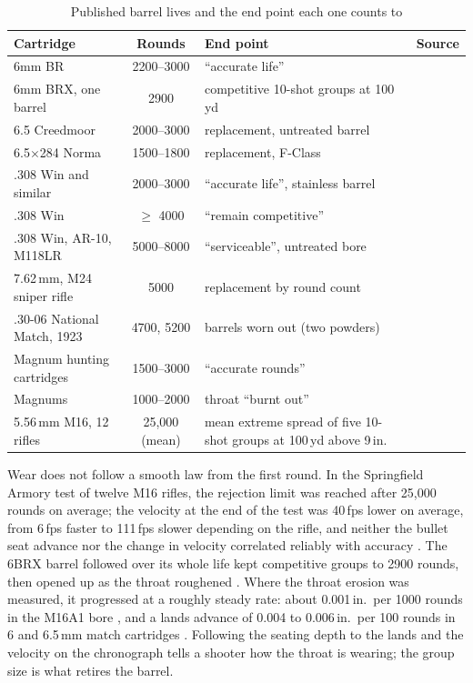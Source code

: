 \documentclass[11pt,twoside,openright]{report}
\begin{document}
\begin{table}[H]
\centering
\caption{Published barrel lives and the end point each one counts to}
\label{tab:barrel_life}
\footnotesize
\setlength{\tabcolsep}{4pt}
\begin{tabularx}{\textwidth}{@{}lcX>{\raggedright\arraybackslash}p{3.1cm}@{}}
\toprule
\textbf{Cartridge} & \textbf{Rounds} & \textbf{End point} & \textbf{Source} \\
\midrule
6mm BR & 2200--3000 & ``accurate life'' & \citet{accurateshooter_barrelcost} \\
6mm BRX, one barrel & 2900 & competitive 10-shot groups at 100\,yd & \citet{accurateshooter2008_6brx} \\
6.5 Creedmoor & 2000--3000 & replacement, untreated barrel & \citet{criterion2017barrel} \\
6.5$\times$284 Norma & 1500--1800 & replacement, F-Class & \citet{criterion2017barrel} \\
.308 Win and similar & 2000--3000 & ``accurate life'', stainless barrel & \citet{lilja_faq} \\
.308 Win & $\geq$ 4000 & ``remain competitive'' & \citet{accurateshooter_barrelcost} \\
.308 Win, AR-10, M118LR & 5000--8000 & ``serviceable'', untreated bore & \citet{criterion2017barrel} \\
7.62\,mm, M24 sniper rifle & 5000 & replacement by round count & \citet{fm2310} \\
.30-06 National Match, 1923 & 4700, 5200 & barrels worn out (two powders) & \citet[p.~331]{hatcher1962notebook} \\
Magnum hunting cartridges & 1500--3000 & ``accurate rounds'' & \citet{lilja_faq} \\
Magnums & 1000--2000 & throat ``burnt out'' & \citet[p.~83]{vaughn1998} \\
5.56\,mm M16, 12 rifles & 25{,}000 (mean) & mean extreme spread of five 10-shot groups at 100\,yd above 9\,in. & \citet{landry1966m16} \\
\bottomrule
\end{tabularx}
\end{table}

Wear does not follow a smooth law from the first round. In the Springfield Armory test of twelve M16 rifles, the rejection limit was reached after 25{,}000 rounds on average; the velocity at the end of the test was 40\,fps lower on average, from 6\,fps faster to 111\,fps slower depending on the rifle, and neither the bullet seat advance nor the change in velocity correlated reliably with accuracy \citep{landry1966m16}. The 6BRX barrel followed over its whole life kept competitive groups to 2900 rounds, then opened up as the throat roughened \citep{accurateshooter2008_6brx}. Where the throat erosion was measured, it progressed at a roughly steady rate: about 0.001\,in.\ per 1000 rounds in the M16A1 bore \citep{yalamanchili1977m16}, and a lands advance of 0.004 to 0.006\,in.\ per 100 rounds in 6 and 6.5\,mm match cartridges \citep{zant2020barrel}. Following the seating depth to the lands and the velocity on the chronograph tells a shooter how the throat is wearing; the group size is what retires the barrel.
\end{document}
